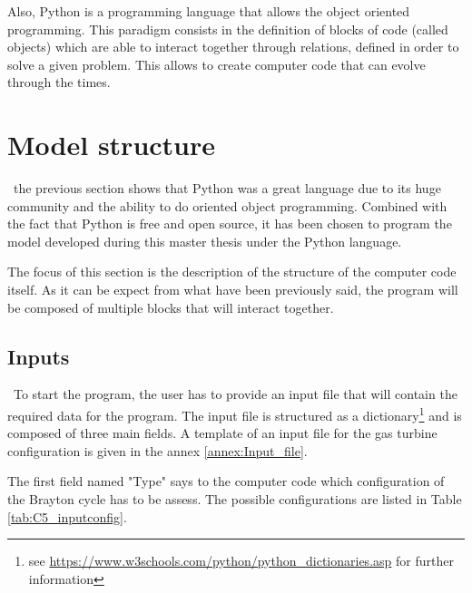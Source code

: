 Also, Python is a programming language that allows the object oriented programming. This paradigm consists in the definition of blocks of code (called objects) which are able to interact together through relations, defined in order to solve a given problem. This allows to create computer code that can evolve through the times. 

\section{Model structure}
\quad\, the previous section shows that Python was a great language due to its huge community and the ability to do oriented object programming. Combined with the fact that Python is free and open source, it has been chosen to program the model developed during this master thesis under the Python language.

The focus of this section is the description of the structure of the computer code itself. As it can be expect from what have been previously said, the program will be composed of multiple blocks that will interact together.

\subsection{Inputs}
\quad\, To start the program, the user has to provide an input file that will contain the required data for the program. The input file is structured as a dictionary\footnote{see \url{https://www.w3schools.com/python/python_dictionaries.asp} for further information} and is composed of three main fields. A template of an input file for the gas turbine configuration is given in the annex \ref{annex:Input_file}.

The first field named "Type" says to the computer code which configuration of the Brayton cycle has to be assess. The possible configurations are listed in Table \ref{tab:C5_inputconfig}.

